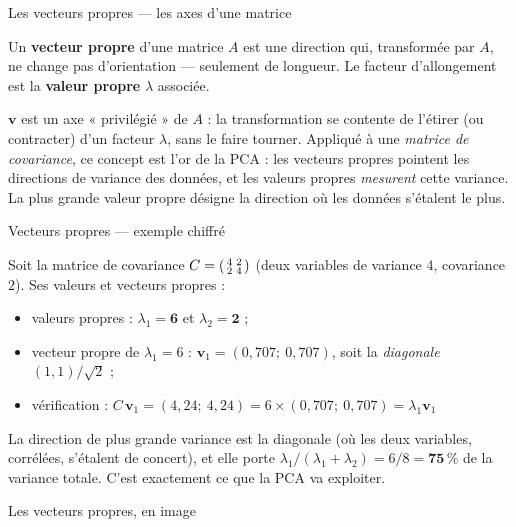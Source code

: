 \documentclass[aspectratio=169,11pt]{beamer}
\begin{document}
\begin{frame}{Les vecteurs propres — les axes d'une matrice}
\begin{ucaddef}[Définition]
{\small Un \textbf{vecteur propre} d'une matrice $A$ est une direction qui, transformée par $A$, ne change pas d'orientation — seulement de longueur. Le facteur d'allongement est la \textbf{valeur propre} $\lambda$ associée.}
\end{ucaddef}
{\small $\mathbf{v}$ est un axe « privilégié » de $A$ : la transformation se contente de l'étirer (ou contracter) d'un facteur $\lambda$, sans le faire tourner. Appliqué à une \emph{matrice de covariance}, ce concept est l'or de la PCA : les vecteurs propres pointent les directions de variance des données, et les valeurs propres \emph{mesurent} cette variance. La plus grande valeur propre désigne la direction où les données s'étalent le plus.}
\end{frame}

\begin{frame}{Vecteurs propres — exemple chiffré}
\begin{ucadex}
{\small Soit la matrice de covariance $C = \begin{psmallmatrix} 4 & 2 \\ 2 & 4 \end{psmallmatrix}$ (deux variables de variance $4$, covariance $2$). Ses valeurs et vecteurs propres :
\begin{itemize}
  \item valeurs propres : $\lambda_1 = \mathbf{6}$ et $\lambda_2 = \mathbf{2}$ ;
  \item vecteur propre de $\lambda_1 = 6$ : $\mathbf{v}_1 = (0{,}707;\ 0{,}707)$, soit la \emph{diagonale} $(1,1)/\sqrt 2$ ;
  \item vérification : $C\,\mathbf{v}_1 = (4{,}24;\ 4{,}24) = 6 \times (0{,}707;\ 0{,}707) = \lambda_1 \mathbf{v}_1$ \checkmark
\end{itemize}
La direction de plus grande variance est la diagonale (où les deux variables, corrélées, s'étalent de concert), et elle porte $\lambda_1 / (\lambda_1 + \lambda_2) = 6/8 = \mathbf{75\,\%}$ de la variance totale. C'est exactement ce que la PCA va exploiter.}
\end{ucadex}
\end{frame}

\begin{frame}{Les vecteurs propres, en image}
\end{frame}
\end{document}
